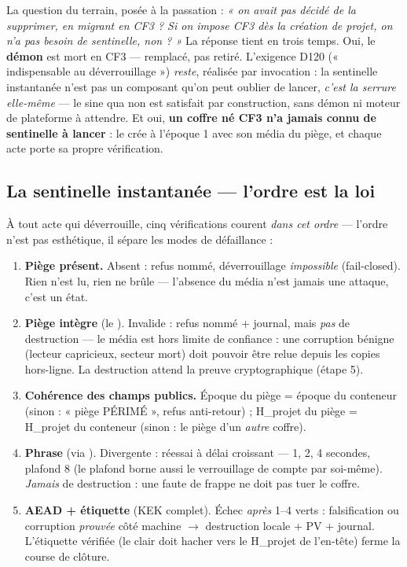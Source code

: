 La question du terrain, posée à la passation : \emph{« on avait pas décidé de la
supprimer, en migrant en CF3 ? Si on impose CF3 dès la création de projet, on n'a pas
besoin de sentinelle, non ? »} La réponse tient en trois temps. Oui, le \textbf{démon}
est mort en CF3 — remplacé, pas retiré. L'exigence D120 (« indispensable au
déverrouillage ») \emph{reste}, réalisée par invocation : la sentinelle instantanée
n'est pas un composant qu'on peut oublier de lancer, \emph{c'est la serrure elle-même}
— le sine qua non est satisfait par construction, sans démon ni moteur de plateforme à
attendre. Et oui, \textbf{un coffre né CF3 n'a jamais connu de sentinelle à lancer} :
 le crée à l'époque 1 avec son média du piège, et chaque acte porte sa
propre vérification.

\subsection{La sentinelle instantanée — l'ordre est la loi}\label{sec:sentinst}

À tout acte qui déverrouille, cinq vérifications courent \emph{dans cet ordre} —
l'ordre n'est pas esthétique, il sépare les modes de défaillance :

\begin{enumerate}
\item \textbf{Piège présent.} Absent : refus nommé, déverrouillage \emph{impossible}
(fail-closed). Rien n'est lu, rien ne brûle — l'absence du média n'est jamais une
attaque, c'est un état.
\item \textbf{Piège intègre} (le ). Invalide : refus nommé + journal, mais
\emph{pas} de destruction — le média est hors limite de confiance : une corruption
bénigne (lecteur capricieux, secteur mort) doit pouvoir être relue depuis les copies
hors-ligne. La destruction attend la preuve cryptographique (étape 5).
\item \textbf{Cohérence des champs publics.} Époque du piège = époque du conteneur
(sinon : « piège PÉRIMÉ », refus anti-retour) ; H\_projet du piège = H\_projet du
conteneur (sinon : le piège d'un \emph{autre} coffre).
\item \textbf{Phrase} (via ). Divergente : réessai à délai croissant —
1, 2, 4 secondes, plafond 8 (le plafond borne aussi le verrouillage de compte par
soi-même). \emph{Jamais} de destruction : une faute de frappe ne doit pas tuer le
coffre.
\item \textbf{AEAD + étiquette} (KEK complet). Échec \emph{après} 1--4 verts :
falsification ou corruption \emph{prouvée} côté machine $\to$ destruction locale +
PV + journal. L'étiquette vérifiée (le clair doit hacher vers le H\_projet de
l'en-tête) ferme la course de clôture.
\end{enumerate}

